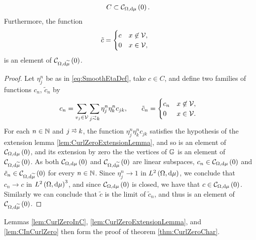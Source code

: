 \begin{lemma} \label{lem:CInCurlZero}
	\begin{align*}
		C \subset \mathcal{C}_{ \Omega, \mathrm{d}\mu}\left( 0 \right).
	\end{align*}
	Furthermore, the function
	\begin{align*}
		\tilde{c} &= \begin{cases} c & x\not\in\mathcal{V}, \\ 0 & x\in\mathcal{V}, \end{cases}
	\end{align*}
	is an element of $\mathcal{C}_{ \Omega, \mathrm{d}\widetilde{\mu}}\left( 0 \right)$.
\end{lemma}
\begin{proof}
	Let $\eta_j^n$ be as in \eqref{eq:SmoothEtaDef}, take $c\in C$, and define two families of functions $c_n$, $\tilde{c}_n$ by
	\begin{align*}
		c_n = \sum_{v_j\in\vertSet}\sum_{j\conLeft k} \eta_j^n \eta_k^n c_{jk},
		\qquad
		\tilde{c}_n = \begin{cases} c_n & x\not\in\vertSet, \\ 0 & x\in\vertSet. \end{cases}
	\end{align*}
	For each $n\in\mathbb{N}$ and $j\conLeft k$, the function $\eta_j^n \eta_k^n c_{jk}$ satisfies the hypothesis of the extension lemma \ref{lem:CurlZeroExtensionLemma}, and so is an element of $\mathcal{C}_{ \Omega, \mathrm{d}\mu}\left( 0 \right)$, and its extension by zero the the vertices of $\mathbb{G}$ is an element of $\mathcal{C}_{ \Omega, \mathrm{d}\widetilde{\mu}}\left( 0 \right)$.
	As both $\mathcal{C}_{ \Omega, \mathrm{d}\mu}\left( 0 \right)$ and $\mathcal{C}_{ \Omega, \mathrm{d}\widetilde{\mu}}\left( 0 \right)$ are linear subspaces, $c_n\in\mathcal{C}_{ \Omega, \mathrm{d}\mu}\left( 0 \right)$ and $\tilde{c}_n\in\mathcal{C}_{ \Omega, \mathrm{d}\widetilde{\mu}}\left( 0 \right)$ for every $n\in\mathbb{N}$.
	Since $\eta_j^n\rightarrow 1$ in $L^{2}\left( \Omega,\mathrm{d} \mu \right)$, we conclude that $c_n\rightarrow c$ in $L^{2}\left( \Omega,\mathrm{d} \mu \right)^3$, and since $\mathcal{C}_{ \Omega, \mathrm{d}\mu}\left( 0 \right)$ is closed, we have that $c\in\mathcal{C}_{ \Omega, \mathrm{d}\mu}\left( 0 \right)$.
	Similarly we can conclude that $\tilde{c}$ is the limit of $\tilde{c}_n$, and thus is an element of $\mathcal{C}_{ \Omega, \mathrm{d}\widetilde{\mu}}\left( 0 \right)$.
\end{proof}
Lemmas \ref{lem:CurlZeroInC}, \ref{lem:CurlZeroExtensionLemma}, and \ref{lem:CInCurlZero} then form the proof of theorem \ref{thm:CurlZeroChar}.

